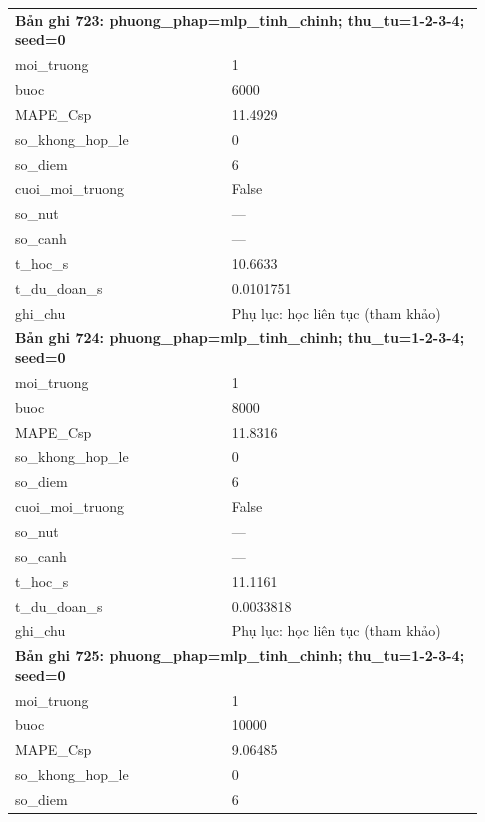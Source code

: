 \begin{longtable}{p{0.43\linewidth}p{0.50\linewidth}}
\midrule
\multicolumn{2}{p{0.95\linewidth}}{\textbf{Bản ghi 723: phuong\_phap=mlp\_tinh\_chinh; thu\_tu=1-2-3-4; seed=0}} \\
moi\_\allowbreak truong & 1 \\
buoc & 6000 \\
MAPE\_\allowbreak Csp & 11.4929 \\
so\_\allowbreak khong\_\allowbreak hop\_\allowbreak le & 0 \\
so\_\allowbreak diem & 6 \\
cuoi\_\allowbreak moi\_\allowbreak truong & False \\
so\_\allowbreak nut & — \\
so\_\allowbreak canh & — \\
t\_\allowbreak hoc\_\allowbreak s & 10.6633 \\
t\_\allowbreak du\_\allowbreak doan\_\allowbreak s & 0.0101751 \\
ghi\_\allowbreak chu & Phụ lục: học liên tục (tham khảo) \\
\midrule
\multicolumn{2}{p{0.95\linewidth}}{\textbf{Bản ghi 724: phuong\_phap=mlp\_tinh\_chinh; thu\_tu=1-2-3-4; seed=0}} \\
moi\_\allowbreak truong & 1 \\
buoc & 8000 \\
MAPE\_\allowbreak Csp & 11.8316 \\
so\_\allowbreak khong\_\allowbreak hop\_\allowbreak le & 0 \\
so\_\allowbreak diem & 6 \\
cuoi\_\allowbreak moi\_\allowbreak truong & False \\
so\_\allowbreak nut & — \\
so\_\allowbreak canh & — \\
t\_\allowbreak hoc\_\allowbreak s & 11.1161 \\
t\_\allowbreak du\_\allowbreak doan\_\allowbreak s & 0.0033818 \\
ghi\_\allowbreak chu & Phụ lục: học liên tục (tham khảo) \\
\midrule
\multicolumn{2}{p{0.95\linewidth}}{\textbf{Bản ghi 725: phuong\_phap=mlp\_tinh\_chinh; thu\_tu=1-2-3-4; seed=0}} \\
moi\_\allowbreak truong & 1 \\
buoc & 10000 \\
MAPE\_\allowbreak Csp & 9.06485 \\
so\_\allowbreak khong\_\allowbreak hop\_\allowbreak le & 0 \\
so\_\allowbreak diem & 6 \\

\end{longtable}
